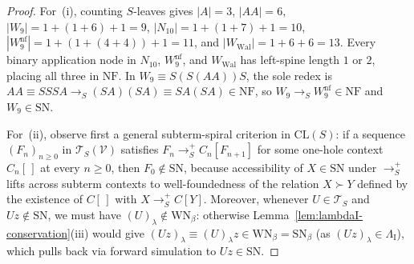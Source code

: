 \documentclass[11pt,reqno]{amsart}
\numberwithin{equation}{section}
\theoremstyle{plain}
\theoremstyle{definition}
\theoremstyle{remark}
\newcommand{\CLS}{\mathrm{CL}(S)}
\newcommand{\TS}{\mathcal{T}_S}
\newcommand{\TSV}{\mathcal{T}_S(\mathcal{V})}
\newcommand{\NF}{\mathrm{NF}}
\newcommand{\SN}{\mathrm{SN}}
\newcommand{\WN}{\mathrm{WN}}
\newcommand{\redS}{\to_S}
\newcommand{\redSp}{\to_S^+}
\begin{document}
\begin{proof}
For~(i), counting $S$-leaves gives $|A| = 3$, $|A A| = 6$, $|W_9| = 1 + (1 + 6) + 1 = 9$, $|N_{10}| = 1 + (1 + 7) + 1 = 10$, $|W_9^{\mathrm{nf}}| = 1 + (1 + (4 + 4)) + 1 = 11$, and $|W_{\mathrm{Wal}}| = 1 + 6 + 6 = 13$. Every binary application node in $N_{10}$, $W_9^{\mathrm{nf}}$, and $W_{\mathrm{Wal}}$ has left-spine length $1$ or $2$, placing all three in $\NF$. In $W_9 \equiv S(S(A A))S$, the sole redex is $A A \equiv S S S A \redS (S A)(S A) \equiv S A (S A) \in \NF$, so $W_9 \redS W_9^{\mathrm{nf}} \in \NF$ and $W_9 \in \SN$.

For~(ii), observe first a general subterm-spiral criterion in $\CLS$: if a sequence $(F_n)_{n \ge 0}$ in $\TSV$ satisfies $F_n \redSp C_n[F_{n+1}]$ for some one-hole context $C_n[\,]$ at every $n \ge 0$, then $F_0 \notin \SN$, because accessibility of $X \in \SN$ under $\redSp$ lifts across subterm contexts to well-foundedness of the relation $X \succ Y$ defined by the existence of $C[\,]$ with $X \redSp C[Y]$. Moreover, whenever $U \in \TS$ and $U z \notin \SN$, we must have $(U)_\lambda \notin \WN_\beta$: otherwise Lemma~\ref{lem:lambdaI-conservation}(iii) would give $(U z)_\lambda \equiv (U)_\lambda z \in \WN_\beta = \SN_\beta$ (as $(U z)_\lambda \in \Lambda_{\mathrm{I}}$), which pulls back via forward simulation to $U z \in \SN$.


\end{proof}
\end{document}
